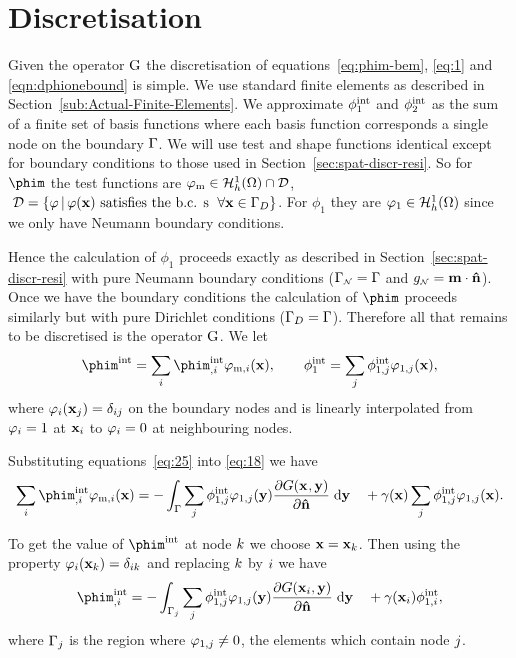 \section{Discretisation}
\label{sec:discretisation}

Given the operator ${\mathbf{\mathrm{G}}}$ the discretisation of equations~\eqref{eq:phim-bem}, \eqref{eq:1} and \eqref{eqn:dphionebound} is simple. We use standard finite elements as described in Section~\ref{sub:Actual-Finite-Elements}. We approximate $\phi^{\text{int}}_1$ and $\phi^{\text{int}}_2$ as the sum of a finite set of basis functions where each basis function corresponds a single node on the boundary ${\Gamma}$. We will use test and shape functions identical except for boundary conditions to those used in Section~\ref{sec:spat-discr-resi}. So for $\phim$ the test functions are $\varphi_{\text{m}} \in {\mathcal{H}^1_h(\Omega)} \cap \mathcal{D}$, $\;\mathcal{D} = \{ \varphi \,|\, \varphi(\mathbf{x}) \text{ satisfies the b.c. s } \; \forall \mathbf{x} \in {\Gamma}_D \}$. For $\phi_1$ they are $\varphi_1 \in {\mathcal{H}^1_h(\Omega)}$ since we only have Neumann boundary conditions.

Hence the calculation of $\phi_1$ proceeds exactly as described in Section~\ref{sec:spat-discr-resi} with pure Neumann boundary conditions (${\Gamma}_{\scriptscriptstyle{\mathcal{N}}} = {\Gamma}$ and $g_{\scriptscriptstyle{\mathcal{N}}} = \mathbf{m} \cdot \mathbf{\hat{n}}$). Once we have the boundary conditions the calculation of $\phim$ proceeds similarly but with pure Dirichlet conditions (${\Gamma}_D = {\Gamma}$). Therefore all that remains to be discretised is the operator ${\mathbf{\mathrm{G}}}$. We let
\begin{equation}
  \phim^\inte = \sum_\ibasis \phim_{,\ibasis}^\inte \tbf_{\text{m},\ibasis}(\xv),
  \qquad
  \phi^\inte_1 = \sum_\ibasisb \phi^\inte_{1,\ibasisb} \tbf_{1,\ibasisb}(\xv),
  \label{eq:25}
\end{equation}
where $\varphi_{i}(\mathbf{x}_{j}) = \delta_{{i} {j}}$ on the boundary nodes and is linearly interpolated from $\varphi_{i} = 1$ at $\mathbf{x}_{i}$ to $\varphi_{i} = 0$ at neighbouring nodes.

Substituting equations~\eqref{eq:25} into \eqref{eq:18} we have
\begin{equation*}
  \sum_\ibasis \phim_{,\ibasis}^\inte \tbf_{\text{m},\ibasis}(\xv) =
  - \int_{\boundd} \sum_\ibasisb \phi^\inte_{1,\ibasisb} \tbf_{1,\ibasisb}(\yv)
  \pd{\Green}{\nv} \d \yv
  \quad + \gamma(\xv) \sum_\ibasisb \phi^\inte_{1,\ibasisb} \tbf_{1,\ibasisb}(\xv).
\end{equation*}

To get the value of $\phim^\inte$ at node ${k}$ we choose $\mathbf{x} = \mathbf{x}_{k}$. Then using the property $\varphi_{i}(\mathbf{x}_{k}) = \delta_{{i} {k}}$ and replacing ${k}$ by ${i}$ we have
\begin{equation}
  \phim_{,\ibasis}^\inte =
  - \int_{\boundd_\ibasisb} \sum_\ibasisb \phi^\inte_{1,\ibasisb} \tbf_{1,\ibasisb}(\yv)
  \pd{\Green[\ibasis]}{\nv} \d \yv
  \quad + \gamma(\xv_\ibasis) \phi^\inte_{1,\ibasis},
  \label{eq:colocation}
\end{equation}
where ${{\Gamma}_{j}}$ is the region where $\varphi_{1,{j}} \neq 0$, \ie the elements which contain node ${j}$.

